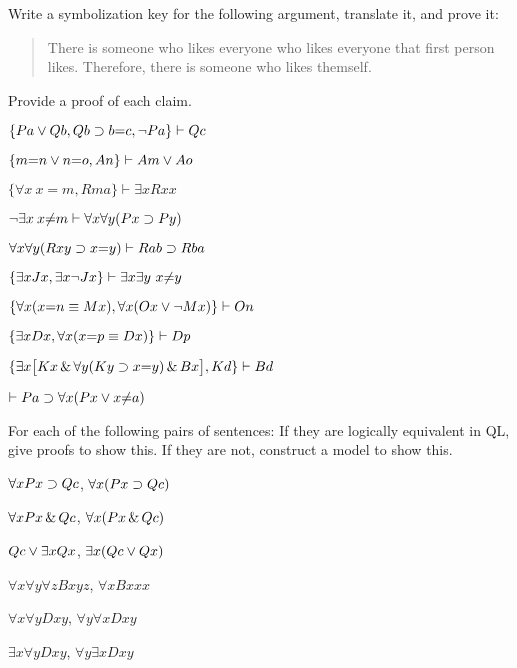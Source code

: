 \solutions
\problempart
\label{pr.likes}
Write a symbolization key for the following argument, translate it, and prove it:
\begin{quote}
There is someone who likes everyone who likes everyone that first person likes. Therefore, there is someone who likes themself.
\end{quote}

\problempart
\label{pr.identity}
Provide a proof of each claim.
\begin{earg}
\item $\{Pa \vee Qb, Qb \supset b{=}c, \neg Pa\}\vdash Qc$
\item $\{m{=}n \vee n{=}o, An\}\vdash Am \vee Ao$
\item $\{\forall x \: x{=}m, Rma\}\vdash \exists x Rxx$
\item $\neg \exists x \: x {\neq} m \vdash \forall x\forall y (Px \supset Py)$
\item $\forall x\forall y(Rxy \supset x{=}y)\vdash Rab \supset Rba$
\item $\{\exists x Jx, \exists x \neg Jx\}\vdash \exists x \exists y\ x{\neq} y$
\item $\{\forall x(x{=}n \equiv Mx), \forall x(Ox \vee \neg Mx)\}\vdash On$
\item $\{\exists x Dx, \forall x(x{=}p \equiv Dx)\}\vdash Dp$
\item $\{\exists x\bigl[Kx \,\&\, \forall y(Ky \supset x{=}y) \,\&\, Bx\bigr], Kd\}\vdash Bd$
\item $\vdash Pa \supset \forall x(Px \vee x {\neq} a)$
\end{earg}



\solutions
\problempart
\label{pr.QLequivornot}
For each of the following pairs of sentences: If they are logically equivalent in QL, give proofs to show this. If they are not, construct a model to show this.
\begin{earg}
\item $\forall x Px \supset Qc$, $\forall x (Px \supset Qc)$
\item $\forall x Px \,\&\, Qc$, $\forall x (Px \,\&\, Qc)$
\item $Qc \vee \exists x Qx$, $\exists x (Qc \vee Qx)$
\item $\forall x\forall y \forall z Bxyz$, $\forall x Bxxx$
\item $\forall x\forall y Dxy$, $\forall y\forall x Dxy$
\item $\exists x\forall y Dxy$, $\forall y\exists x Dxy$
\end{earg}

